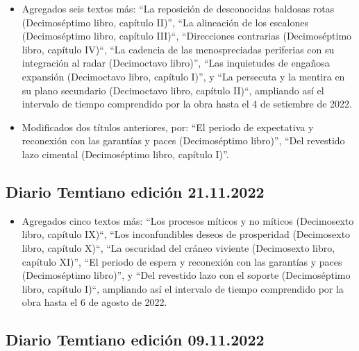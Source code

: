 \documentclass[
]{book}
\providecommand{\tightlist}{%
  \setlength{\itemsep}{0pt}\setlength{\parskip}{0pt}}
\begin{document}
\begin{itemize}
\item
  Agregados seis textos más: ``La reposición de desconocidas baldosas rotas (Decimoséptimo libro, capítulo II)'', ``La alineación de los escalones (Decimoséptimo libro, capítulo III)``, ``Direcciones contrarias (Decimoséptimo libro, capítulo IV)``, ``La cadencia de las menospreciadas periferias con su integración al radar (Decimoctavo libro)'', ``Las inquietudes de engañosa expansión (Decimoctavo libro, capítulo I)'', y ``La persecuta y la mentira en su plano secundario (Decimoctavo libro, capítulo II)``, ampliando así el intervalo de tiempo comprendido por la obra hasta el 4 de setiembre de 2022.
\item
  Modificados dos títulos anteriores, por: ``El periodo de expectativa y reconexión con las garantías y paces (Decimoséptimo libro)'', ``Del revestido lazo cimental (Decimoséptimo libro, capítulo I)''.
\end{itemize}

\hypertarget{diario-temtiano-ediciuxf3n-21.11.2022}{%
\subsection*{Diario Temtiano edición 21.11.2022}\label{diario-temtiano-ediciuxf3n-21.11.2022}}

\begin{itemize}
\tightlist
\item
  Agregados cinco textos más: ``Los procesos míticos y no míticos (Decimosexto libro, capítulo IX)``, ``Los inconfundibles deseos de prosperidad (Decimosexto libro, capítulo X)``, ``La oscuridad del cráneo viviente (Decimosexto libro, capítulo XI)'', ``El periodo de espera y reconexión con las garantías y paces (Decimoséptimo libro)'', y ``Del revestido lazo con el soporte (Decimoséptimo libro, capítulo I)``, ampliando así el intervalo de tiempo comprendido por la obra hasta el 6 de agosto de 2022.
\end{itemize}

\hypertarget{diario-temtiano-ediciuxf3n-09.11.2022}{%
\subsection*{Diario Temtiano edición 09.11.2022}\label{diario-temtiano-ediciuxf3n-09.11.2022}}
\end{document}
